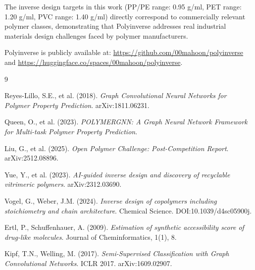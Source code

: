 \documentclass{article}
\begin{document}
The inverse design targets in this work (PP/PE range: 0.95 g/ml, 
PET range: 1.20 g/ml, PVC range: 1.40 g/ml) directly correspond to 
commercially relevant polymer classes, demonstrating that Polyinverse 
addresses real industrial materials design challenges faced by polymer 
manufacturers.

Polyinverse is publicly available at:
\url{https://github.com/00mahoon/polyinverse} and
\url{https://huggingface.co/spaces/00mahoon/polyinverse}.


\begin{thebibliography}{9}

Reyes-Lillo, S.E., et al. (2018).
\textit{Graph Convolutional Neural Networks for Polymer Property Prediction}.
arXiv:1811.06231.

Queen, O., et al. (2023).
\textit{POLYMERGNN: A Graph Neural Network Framework for Multi-task Polymer Property Prediction}.

Liu, G., et al. (2025).
\textit{Open Polymer Challenge: Post-Competition Report}.
arXiv:2512.08896.

Yue, Y., et al. (2023).
\textit{AI-guided inverse design and discovery of recyclable vitrimeric polymers}.
arXiv:2312.03690.

Vogel, G., Weber, J.M. (2024).
\textit{Inverse design of copolymers including stoichiometry and chain architecture}.
Chemical Science. DOI:10.1039/d4sc05900j.

Ertl, P., Schuffenhauer, A. (2009).
\textit{Estimation of synthetic accessibility score of drug-like molecules}.
Journal of Cheminformatics, 1(1), 8.

Kipf, T.N., Welling, M. (2017).
\textit{Semi-Supervised Classification with Graph Convolutional Networks}.
ICLR 2017. arXiv:1609.02907.

\end{thebibliography}
\end{document}

